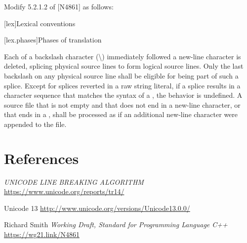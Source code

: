 \documentclass{wg21}
\begin{document}
Modify 5.2.1.2 of [N4861] as follows:

[lex]{Lexical conventions}



[lex.phases]{Phases of translation}%

Each  of a backslash character (\textbackslash)
immediately followed  a new-line character is deleted, splicing
physical source lines to form logical source lines. Only the last
backslash on any physical source line shall be eligible for being part
of such a splice.
Except for splices reverted in a raw string literal, if a splice results in
a character sequence that matches the
syntax of a , the behavior is
undefined. A source file that is not empty and that does not end in a new-line character, or that ends in a ,
shall be processed as if an additional new-line character were appended
to the file.


\section{References}
\renewcommand{\section}[2]{}%



\begin{thebibliography}{9}
    
\emph{UNICODE LINE BREAKING ALGORITHM}\newline
\url{https://www.unicode.org/reports/tr14/}

Unicode 13\newline
\url{http://www.unicode.org/versions/Unicode13.0.0/}

Richard Smith
\emph{Working Draft, Standard for Programming Language C++}\newline
\url{https://wg21.link/N4861}

\end{thebibliography}
\end{document}
